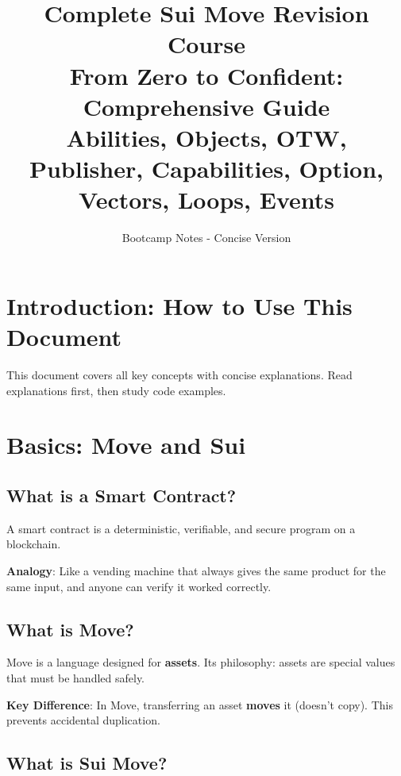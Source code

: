 \documentclass[11pt]{article}
\title{\textbf{Complete Sui Move Revision Course}\\
\large From Zero to Confident: Comprehensive Guide\\
\large Abilities, Objects, OTW, Publisher, Capabilities, Option, Vectors, Loops, Events}
\author{Bootcamp Notes - Concise Version}
\date{}
\begin{document}
\maketitle
\tableofcontents
\newpage

\section{Introduction: How to Use This Document}

\begin{noteBox}
This document covers all key concepts with concise explanations. Read explanations first, then study code examples.
\end{noteBox}

\section{Basics: Move and Sui}

\subsection{What is a Smart Contract?}

A smart contract is a deterministic, verifiable, and secure program on a blockchain.

\begin{exampleBox}
\textbf{Analogy}: Like a vending machine that always gives the same product for the same input, and anyone can verify it worked correctly.
\end{exampleBox}

\subsection{What is Move?}

Move is a language designed for \textbf{assets}. Its philosophy: assets are special values that must be handled safely.

\begin{noteBox}
\textbf{Key Difference}: In Move, transferring an asset \textbf{moves} it (doesn't copy). This prevents accidental duplication.
\end{noteBox}

\subsection{What is Sui Move?}
\end{document}
